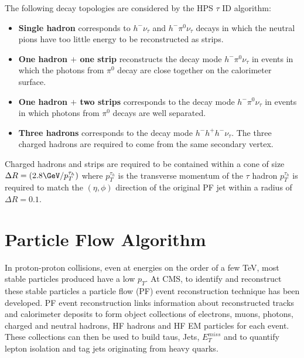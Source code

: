 The following decay topologies are considered by the HPS $\tau$ ID algorithm:
\begin{itemize}
\item{\bf Single hadron}
      corresponds to $ h^{-} \nu_{\tau}$
      and $ h^{-} \pi^{0} \nu_{\tau}$ decays
      in which the neutral pions have too little energy to be reconstructed as strips.
\item{\bf One hadron $+$ one strip}
      reconstructs the decay mode $ h^{-} \pi^{0} \nu_{\tau}$
      in events in which the photons from $\pi^{0}$ decay
      are close together on the calorimeter surface.
\item{\bf One hadron $+$ two strips}
      corresponds to the decay mode $ h^{-} \pi^{0} \nu_{\tau}$
      in events in which photons from $\pi^{0}$ decays are well separated.
\item{\bf Three hadrons}
      corresponds to the decay mode $ h^{-} h^{+} h^{-} \nu_{\tau}$.
      The three charged hadrons are required                                                                                                      
      to come from the same secondary vertex.
\end {itemize}

Charged hadrons and strips are required to be contained within a cone
of size $\Delta R=(2.8\GeV/p_{T}^{\tau_{h}})$ where $p_{T}^{\tau_{h}}$ is 
the transverse momentum of the $\tau$ hadron $p_{T}^{\tau_{h}}$ is 
required to match the $(\eta,\phi)$ direction of the original PF jet within
a radius of $\Delta R=0.1$. 


\section{Particle Flow Algorithm}
In proton-proton collisions, even at energies on the order of a few TeV, 
most stable particles produced have a low $p_{T}$.
At CMS, to identify and reconstruct these stable particles a particle flow (PF) event 
reconstruction technique has been developed. PF event reconstruction links 
information %
about reconstructed tracks and calorimeter deposits
to form object collections of 
electrons, muons, photons, charged and neutral hadrons, HF hadrons and HF EM particles
for each event. These collections can then be used to build taus, Jets, $E_{T}^{miss}$
and to quantify lepton isolation and tag jets originating from heavy quarks.

